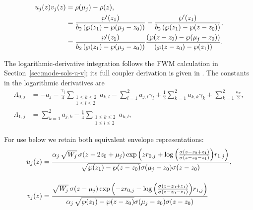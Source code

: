 \documentclass[11pt,a4paper]{article}
\numberwithin{equation}{section}
\begin{document}
\begin{align}
u_j{\left(z\right)} v_j{\left(z\right)} &= \rho(\mu_j) - \rho(z), \notag \\
&= \frac{\wp'{\left(z_{1}\right)}}{ b_2 \left(\wp{\left(z_{1}\right)} - \wp{\left({\mu}_{j} - z_{0}\right)}\right)} - \frac{\wp'{\left(z_{1}\right)}}{b_2 \left(\wp{\left(z_{1}\right)} - \wp{\left(z - z_{0}\right)}\right) }, \notag \\
&= \frac{\wp'{\left(z_{1}\right)} }{ b_2 \left(\wp{\left(z_{1}\right)} - \wp{\left({\mu}_{j}- z_{0}\right)}\right)} \frac{ \left(\wp{\left(z - z_{0}\right)} - \wp{\left({\mu}_{j} - z_{0}\right)}\right) }{ \left(\wp{\left(z - z_{0}\right)} - \wp{\left(z_{1}\right)}\right) }. \label{cc:eq:uv-wp}
\end{align}

The logarithmic-derivative integration follows the FWM calculation in Section~\ref{sec:mode-sols-u-v}; its full coupler derivation is given in \cite{heskethCompleteWeierstrassElliptic2026}.
The constants in the logarithmic derivatives are
\begin{align}
{\Lambda}_{0,j} &= - {a}_{j} - \frac{{\gamma}_{j}}{4}\sum_{\substack{1 \leq k \leq 2\\1 \leq l \leq 2}} {a}_{k,l} - \sum_{l=1}^{2} {a}_{j,l} {\gamma}_{l} + \frac{1}{2}\sum_{k=1}^{2} {a}_{k,k} {\gamma}_{k} + \sum_{k=1}^{2} \frac{{a}_{k}}{2}, \\
{\Lambda}_{1,j} &= \sum_{k=1}^{2} {a}_{j,k} - \frac{1}{4}\sum_{\substack{1 \leq k \leq 2\\1 \leq l \leq 2}}{a}_{k,l},
\end{align}

For use below we retain both equivalent envelope representations:
\begin{align}
u_j{\left(z\right)} &= \frac{\alpha_j\,\sqrt{W_j} \,\sigma{\left(z - 2 z_{0} + {\mu}_{j} \right)} \exp\left(z {r}_{0,j} + \log{\left(\frac{\sigma{\left(z - z_{0} + z_{1} \right)}}{\sigma{\left(z - z_{0} - z_{1} \right)}} \right)} {r}_{1,j}\right)}{\sqrt{\wp{\left(z_{1} \right)} - \wp{\left(z - z_{0} \right)}} \sigma{\left({\mu}_{j} - z_{0}\right)} \sigma{\left(z - z_{0} \right)}}, \notag \\[12pt]
v_j{\left(z\right)} &= \frac{\sqrt{W_j} \,\sigma{\left(z - {\mu}_{j} \right)} \exp\left(- z {r}_{0,j} - \log{\left(\frac{\sigma{\left(z - z_{0} + z_{1} \right)}}{\sigma{\left(z - z_{0} - z_{1} \right)}} \right)} {r}_{1,j} \right)}{\alpha_j\,\sqrt{\wp{\left(z_{1} \right)} - \wp{\left(z - z_{0} \right)}} \sigma{\left({\mu}_{j} - z_{0}\right)} \sigma{\left(z - z_{0}\right)}} \label{cc:eq:u-v-quartic}
\end{align}
\end{document}
